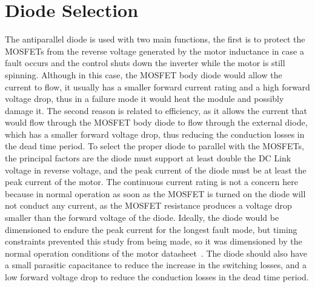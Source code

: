\section{Diode Selection}
The antiparallel diode is used with two main functions, the first is to protect the MOSFETs from the reverse voltage generated by the motor inductance in case a fault occurs and the control shuts down the inverter while the motor is still spinning. Although in this case, the MOSFET body diode would allow the current to flow, it usually has a smaller forward current rating and a high forward voltage drop, thus in a failure mode it would heat the module and possibly damage it. The second reason is related to efficiency, as it allows the current that would flow through the MOSFET body diode to flow through the external diode, which has a smaller forward voltage drop, thus reducing the conduction losses in the dead time period.
To select the proper diode to parallel with the MOSFETs, the principal factors are the diode must support at least double the DC Link voltage in reverse voltage, and the peak current of the diode must be at least the peak current of the motor. The continuous current rating is not a concern here because in normal operation as soon as the MOSFET is turned on the diode will not conduct any current, as the MOSFET resistance produces a voltage drop smaller than the forward voltage of the diode. Ideally, the diode would be dimensioned to endure the peak current for the longest fault mode, but timing constraints prevented this study from being made, so it was dimensioned by the normal operation conditions of the motor datasheet~\cite{amk:DD5-14-10-POW}. The diode should also have a small parasitic capacitance to reduce the increase in the switching losses, and a low forward voltage drop to reduce the conduction losses in the dead time period.

